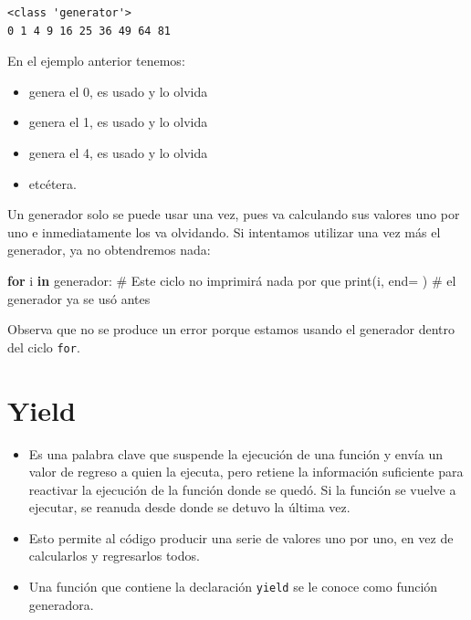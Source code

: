 \documentclass[
  spanish,
  letterpaper,
]{scrbook}
\newenvironment{Shaded}{\begin{snugshade}}{\end{snugshade}}
\newcommand{\BuiltInTok}[1]{\textcolor[rgb]{0.00,0.23,0.31}{#1}}
\newcommand{\CommentTok}[1]{\textcolor[rgb]{0.37,0.37,0.37}{#1}}
\newcommand{\ControlFlowTok}[1]{\textcolor[rgb]{0.00,0.23,0.31}{\textbf{#1}}}
\newcommand{\KeywordTok}[1]{\textcolor[rgb]{0.00,0.23,0.31}{\textbf{#1}}}
\newcommand{\NormalTok}[1]{\textcolor[rgb]{0.00,0.23,0.31}{#1}}
\newcommand{\OperatorTok}[1]{\textcolor[rgb]{0.37,0.37,0.37}{#1}}
\newcommand{\StringTok}[1]{\textcolor[rgb]{0.13,0.47,0.30}{#1}}
\providecommand{\tightlist}{%
  \setlength{\itemsep}{0pt}\setlength{\parskip}{0pt}}
\theoremstyle{definition}
\theoremstyle{remark}
\begin{document}
\begin{verbatim}
<class 'generator'>
0 1 4 9 16 25 36 49 64 81 
\end{verbatim}

En el ejemplo anterior tenemos:

\begin{itemize}
\tightlist
\item
  genera el 0, es usado y lo olvida
\item
  genera el 1, es usado y lo olvida
\item
  genera el 4, es usado y lo olvida
\item
  etcétera.
\end{itemize}

Un generador solo se puede usar una vez, pues va calculando sus valores
uno por uno e inmediatamente los va olvidando. Si intentamos utilizar
una vez más el generador, ya no obtendremos nada:

\begin{Shaded}
\begin{Highlighting}[]
\ControlFlowTok{for}\NormalTok{ i }\KeywordTok{in}\NormalTok{ generador:    }\CommentTok{\# Este ciclo no imprimirá nada por que}
    \BuiltInTok{print}\NormalTok{(i, end}\OperatorTok{=}\StringTok{\textquotesingle{} \textquotesingle{}}\NormalTok{)   }\CommentTok{\# el generador ya se usó antes}
\end{Highlighting}
\end{Shaded}

Observa que no se produce un error porque estamos usando el generador
dentro del ciclo \texttt{for}.

\section{Yield}\label{yield}

\begin{itemize}
\item
  Es una palabra clave que suspende la ejecución de una función y envía
  un valor de regreso a quien la ejecuta, pero retiene la información
  suficiente para reactivar la ejecución de la función donde se quedó.
  Si la función se vuelve a ejecutar, se reanuda desde donde se detuvo
  la última vez.
\item
  Esto permite al código producir una serie de valores uno por uno, en
  vez de calcularlos y regresarlos todos.
\item
  Una función que contiene la declaración \texttt{yield} se le conoce
  como función generadora.
\end{itemize}
\end{document}

